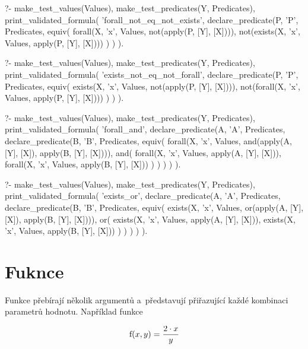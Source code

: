 \begin{fact}
\begin{prolog}
?- 	make_test_values(Values),
	make_test_predicates(Y, Predicates),
	print_validated_formula(
		'forall_not_eq_not_exists',
		declare_predicate(P, 'P', Predicates,
			equiv(
				forall(X, 'x', Values, not(apply(P, [Y], [X]))),
				not(exists(X, 'x', Values, apply(P, [Y], [X])))
			)
		)
	).
\end{prolog}
\begin{prolog}
?- 	make_test_values(Values), make_test_predicates(Y, Predicates),
	print_validated_formula(
		'exists_not_eq_not_forall',
		declare_predicate(P, 'P', Predicates,
			equiv(
				exists(X, 'x', Values, not(apply(P, [Y], [X]))),
				not(forall(X, 'x', Values, apply(P, [Y], [X])))
			)
		)
	).
\end{prolog}
\begin{prolog}
?- 	make_test_values(Values),
	make_test_predicates(Y, Predicates),
	print_validated_formula(
		'forall_and',
		declare_predicate(A, 'A', Predicates,
			declare_predicate(B, 'B', Predicates,
				equiv(
					forall(X, 'x', Values, and(apply(A, [Y], [X]), apply(B, [Y], [X]))),
					and(
						forall(X, 'x', Values, apply(A, [Y], [X])),
						forall(X, 'x', Values, apply(B, [Y], [X]))
					)
				)
			)
		)
	).
\end{prolog}
\begin{prolog}
?- 	make_test_values(Values),
	make_test_predicates(Y, Predicates),
	print_validated_formula(
		'exists_or',
		declare_predicate(A, 'A', Predicates,
			declare_predicate(B, 'B', Predicates,
				equiv(
					exists(X, 'x', Values, or(apply(A, [Y], [X]), apply(B, [Y], [X]))),
					or(
						exists(X, 'x', Values, apply(A, [Y], [X])),
						exists(X, 'x', Values, apply(B, [Y], [X]))
					)
				)
			)
		)
	).
\end{prolog}
\end{fact}

\section{Fuknce}

Funkce přebírají několik argumentů a~představují  přiřazující každé kombinaci parametrů hodnotu. Například funkce

\begin{equation}
\label{eq:example_function}
\mathrm{f}(x, y) = \frac{2 \cdot x}{y}
\end{equation} 

